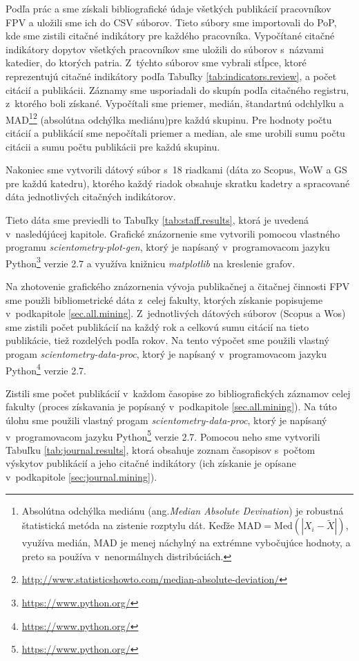 Podľa prác \citet{Kazakis2014a} a \citet{Kazakis2014b,Kazakis2015} sme získali
bibliografické údaje všetkých publikácií pracovníkov FPV a uložili sme ich do
CSV súborov. Tieto súbory sme importovali do PoP, kde sme zistili citačné
indikátory pre každého pracovníka. Vypočítané citačné indikátory dopytov
všetkých pracovníkov sme uložili do súborov s~názvami katedier, do ktorých
patria. Z~týchto súborov sme vybrali stĺpce, ktoré reprezentujú citačné
indikátory podľa Tabuľky \ref{tab:indicators.review}, a počet citácií a
publikácii.  Záznamy sme usporiadali do skupín podľa citačného registru,
z~ktorého boli získané.  Vypočítali sme priemer, medián, štandartnú odchlylku a
MAD\footnote{Absolútna odchýlka mediánu (ang.\emph{Median Absolute Devination})
je robustná štatistická metóda na zistenie rozptylu dát. Keďže $\mathrm{MAD} =
\mathrm{Med}(|X_i - \tilde{X}|)$, využíva medián, MAD je menej náchylný na
extrémne vybočujúce hodnoty, a preto sa používa v~nenormálnych
distribúciách.}\footnote{\url{http://www.statisticshowto.com/median-absolute-deviation/}}
(absolútna odchýlka mediánu)pre každú skupinu. Pre hodnoty počtu citácií a
publikácií sme nepočítali priemer a median, ale sme urobili sumu počtu citácii
a sumu počtu publikácii pre každú skupinu.

Nakoniec sme vytvorili dátový súbor s~18 riadkami (dáta zo Scopus, WoW a GS
pre každú katedru), ktorého každý riadok obsahuje skratku kadetry a spracované
dáta jednotlivých citačných indikátorov.

Tieto dáta sme previedli to Tabuľky \ref{tab:staff.results}, ktorá je
uvedená v~nasledújúcej kapitole. Grafické znázornenie sme vytvorili pomocou
vlastného programu \emph{scientometry-plot-gen}, ktorý je napísaný
v~programovacom jazyku Python\footnote{\url{https://www.python.org/}} verzie 2.7
a využíva knižnicu \emph{matplotlib} na kreslenie grafov.

Na zhotovenie grafického znázornenia vývoja publikačnej a čitačnej činnosti FPV
sme použli bibliometrické dáta z~celej fakulty, ktorých získanie popisujeme
v~podkapitole \ref{sec.all.mining}. Z~jednotlivých dátových súborov (Scopus a Wos)
sme zistili počet publikácií na každý rok  a celkovú sumu citácií na tieto
publikácie, tiež rozdelých podľa rokov. Na tento výpočet sme použili vlastný
progam \emph{scientometry-data-proc}, ktorý je napísaný v~programovacom jazyku
Python\footnote{\url{https://www.python.org/}} verzie 2.7.

Zistili sme počet publikácií v~každom časopise zo bibliografických záznamov
celej fakulty (proces získavania je popísaný v~podkapitole
\ref{sec.all.mining}).  Na túto úlohu sme použili vlastný progam
\emph{scientometry-data-proc}, ktorý je napísaný v~programovacom jazyku
Python\footnote{\url{https://www.python.org/}} verzie 2.7.  Pomocou neho sme
vytvorili  Tabuľku \ref{tab:journal.results}, ktorá obsahuje zoznam časopisov
s~počtom výskytov publikácií a jeho citačné indikátory (ich získanie je opísane
v~podkapitole \ref{sec:journal.mining}). 


